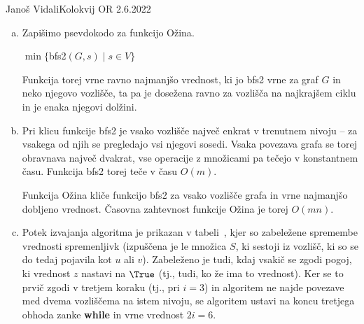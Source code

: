 \begin{naloga}{Janoš Vidali}{Kolokvij OR 2.6.2022}
\begin{odgovor}
\begin{enumerate}[(a)]
Denimo sedaj, da vozlišče $s$ leži na najkrajšem ciklu v grafu $G$,
in naj bo $t$ vozlišče, ki povzroči končanje algoritma
-- očitno mora vozlišče $t$ ležati na nekem najkrajšem ciklu $C$,
ki vsebuje vozlišče $s$.
Potem bodisi obstajata dve najkrajši poti od $s$ do $t$,
ali pa obstajata enolično določeni najkrajši poti enake dolžine
od $s$ do $t$ in vozlišča $t'$, ki je sosedno vozlišču $t$.
V obeh primerih morata biti obe poti po povezavah disjunktni,
sicer bi obstajal cikel, krajši od $C$.
Funkcija {\sc bfs2} v obeh primerih vrne ravno dolžino cikla $C$.

\needspace{\baselineskip}
\item Zapišimo psevdokodo za funkcijo {\sc Ožina}.
\begin{small}
\begin{algorithmic}
    \State \Return $\min\{${\sc bfs2}$(G, s) \mid s \in V\}$
\EndFunction
\end{algorithmic}
\end{small}
Funkcija torej vrne ravno najmanjšo vrednost,
ki jo {\sc bfs2} vrne za graf $G$ in neko njegovo vozlišče,
ta pa je dosežena ravno za vozlišča na najkrajšem ciklu
in je enaka njegovi dolžini.

\item Pri klicu funkcije {\sc bfs2}
je vsako vozlišče največ enkrat v trenutnem nivoju
-- za vsakega od njih se pregledajo vsi njegovi sosedi.
Vsaka povezava grafa se torej obravnava največ dvakrat,
vse operacije z množicami pa tečejo v konstantnem času.
Funkcija {\sc bfs2} torej teče v času $O(m)$.

Funkcija {\sc Ožina} kliče funkcijo {\sc bfs2} za vsako vozlišče grafa
in vrne najmanjšo dobljeno vrednost.
Časovna zahtevnost funkcije {\sc Ožina} je torej $O(mn)$.

\item Potek izvajanja algoritma je prikazan v tabeli~\tab,
kjer so zabeležene spremembe vrednosti spremenljivk
(izpuščena je le množica $S$, ki sestoji iz vozlišč,
ki so se do tedaj pojavila kot $u$ ali $v$).
Zabeleženo je tudi, kdaj vsakič se zgodi pogoj,
ki vrednost $z$ nastavi na $\True$
(tj., tudi, ko že ima to vrednost).
Ker se to prvič zgodi v tretjem koraku (tj., pri $i = 3$)
in algoritem ne najde povezave med dvema vozliščema na istem nivoju,
se algoritem ustavi na koncu tretjega obhoda zanke {\bf while}
in vrne vrednost $2i = 6$.
\end{enumerate}


\end{odgovor}
\end{naloga}
